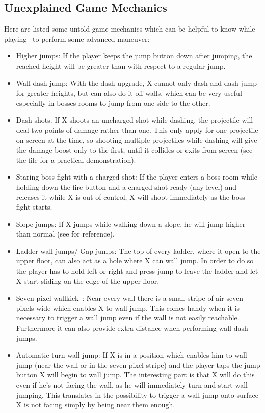 \subsection{Unexplained Game Mechanics}\label{X1:game_mechanics}
Here are listed some untold game mechanics which can be helpful to know while playing~\cite{RTA_wiki:X1} to perform some advanced maneuver: 
\begin{itemize}
	\item Higher jumps: If the player keeps the jump button down after jumping, the reached height will be greater than with respect to a regular jump.
	
	\item Wall dash-jump: With the dash upgrade, X cannot only dash and dash-jump for greater heights, but can also do it off walls, which can be very useful especially in bosses rooms to jump from one side to the other.
	
	\item Dash shots. If X shoots an uncharged shot while dashing, the projectile will deal two points of damage rather than one. This only apply for one projectile on screen at the time, so shooting multiple projectiles while dashing will give the damage boost only to the first, until it collides or exits from screen (see the file  for a practical demonstration).
	
	\item Staring boss fight with a charged shot: If the player enters a boss room while holding down the fire button and a charged shot ready (any level) and releases it while X is out of control, X will shoot immediately as the boss fight starts.
	
	\item Slope jumps: If X jumps while walking down a slope, he will jump higher than normal (see  for reference).
	
	\item Ladder wall jumps/ Gap jumps: The top of every ladder, where it open to the upper floor, can also act as a hole where X can wall jump. In order to do so the player has to hold left or right and press jump to leave the ladder and let X start sliding on the edge of the upper floor.
	
	\item Seven pixel wallkick~\cite{MMX_RTA_wiki:basics}: Near every wall there is a small stripe of air seven pixels wide which enables X to wall jump. This comes handy when it is necessary to trigger a wall jump even if the wall is not easily reachable. Furthermore it can also provide extra distance when performing wall dash-jumps.
	
	\item Automatic turn wall jump: If X is in a position which enables him to wall jump (near the wall or in the seven pixel stripe) and the player taps the jump button X will begin to wall jump. The interesting part is that X will do this even if he's not facing the wall, as he will immediately turn and start wall-jumping. This translates in the possibility to trigger a wall jump onto surface X is not facing simply by being near them enough.
\end{itemize}

